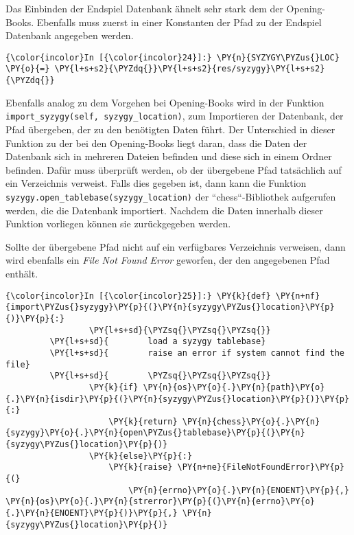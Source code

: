Das Einbinden der Endspiel Datenbank ähnelt sehr stark dem der
Opening-Books. Ebenfalls muss zuerst in einer Konstanten der Pfad zu der
Endspiel Datenbank angegeben werden.

    \begin{Verbatim}[commandchars=\\\{\}]
{\color{incolor}In [{\color{incolor}24}]:} \PY{n}{SYZYGY\PYZus{}LOC} \PY{o}{=} \PY{l+s+s2}{\PYZdq{}}\PY{l+s+s2}{res/syzygy}\PY{l+s+s2}{\PYZdq{}}
\end{Verbatim}

    Ebenfalls analog zu dem Vorgehen bei Opening-Books wird in der Funktion
\texttt{import\_syzygy(self,\ syzygy\_location)}, zum Importieren der
Datenbank, der Pfad übergeben, der zu den benötigten Daten führt. Der
Unterschied in dieser Funktion zu der bei den Opening-Books liegt daran,
dass die Daten der Datenbank sich in mehreren Dateien befinden und diese
sich in einem Ordner befinden. Dafür muss überprüft werden, ob der
übergebene Pfad tatsächlich auf ein Verzeichnis verweist. Falls dies
gegeben ist, dann kann die Funktion
\texttt{syzygy.open\_tablebase(syzygy\_location)} der ``chess``-Bibliothek
aufgerufen werden, die die Datenbank importiert. Nachdem die Daten
innerhalb dieser Funktion vorliegen können sie zurückgegeben werden.

Sollte der übergebene Pfad nicht auf ein verfügbares Verzeichnis
verweisen, dann wird ebenfalls ein \emph{File Not Found Error} geworfen,
der den angegebenen Pfad enthält.

    \begin{Verbatim}[commandchars=\\\{\}]
{\color{incolor}In [{\color{incolor}25}]:} \PY{k}{def} \PY{n+nf}{import\PYZus{}syzygy}\PY{p}{(}\PY{n}{syzygy\PYZus{}location}\PY{p}{)}\PY{p}{:}
                 \PY{l+s+sd}{\PYZsq{}\PYZsq{}\PYZsq{}}
         \PY{l+s+sd}{        load a syzygy tablebase}
         \PY{l+s+sd}{        raise an error if system cannot find the file}
         \PY{l+s+sd}{        \PYZsq{}\PYZsq{}\PYZsq{}}
                 \PY{k}{if} \PY{n}{os}\PY{o}{.}\PY{n}{path}\PY{o}{.}\PY{n}{isdir}\PY{p}{(}\PY{n}{syzygy\PYZus{}location}\PY{p}{)}\PY{p}{:}
                     \PY{k}{return} \PY{n}{chess}\PY{o}{.}\PY{n}{syzygy}\PY{o}{.}\PY{n}{open\PYZus{}tablebase}\PY{p}{(}\PY{n}{syzygy\PYZus{}location}\PY{p}{)}
                 \PY{k}{else}\PY{p}{:}
                     \PY{k}{raise} \PY{n+ne}{FileNotFoundError}\PY{p}{(}
                         \PY{n}{errno}\PY{o}{.}\PY{n}{ENOENT}\PY{p}{,} \PY{n}{os}\PY{o}{.}\PY{n}{strerror}\PY{p}{(}\PY{n}{errno}\PY{o}{.}\PY{n}{ENOENT}\PY{p}{)}\PY{p}{,} \PY{n}{syzygy\PYZus{}location}\PY{p}{)}
\end{Verbatim}

